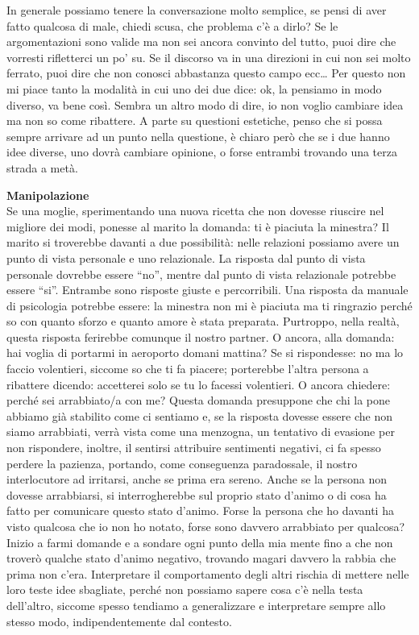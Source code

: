 \documentclass[12pt]{book} %
\begin{document}
In generale possiamo tenere la conversazione molto semplice, se pensi di aver fatto qualcosa di male, chiedi scusa, che problema c'è a dirlo? Se le argomentazioni sono valide ma non sei ancora convinto del tutto, puoi dire che vorresti rifletterci un po' su. Se il discorso va in una direzioni in cui non sei molto ferrato, puoi dire che non conosci abbastanza questo campo ecc…
Per questo non mi piace tanto la modalità in cui uno dei due dice: ok, la pensiamo in modo diverso, va bene così. Sembra un altro modo di dire, io non voglio cambiare idea ma non so come ribattere. A parte su questioni estetiche, penso che si possa sempre arrivare ad un punto nella questione, è chiaro però che se i due hanno idee diverse, uno dovrà cambiare opinione, o forse entrambi trovando una terza strada a metà.

\noindent \textbf{\large Manipolazione} \\
Se una moglie, sperimentando una nuova ricetta che non dovesse riuscire nel migliore dei modi,
ponesse al marito la domanda: ti è piaciuta la minestra? Il marito si troverebbe davanti a due possibilità: nelle
relazioni possiamo avere un punto di vista personale e uno relazionale. La risposta dal punto di vista personale
dovrebbe essere “no”, mentre dal punto di vista relazionale potrebbe essere “si”. Entrambe sono risposte giuste e
percorribili. Una risposta da manuale di psicologia potrebbe essere: la minestra non mi è piaciuta ma ti ringrazio
perché so con quanto sforzo e quanto amore è stata preparata. Purtroppo, nella realtà, questa risposta ferirebbe
comunque il nostro partner. O ancora, alla domanda: hai voglia di portarmi in aeroporto domani mattina? Se si
rispondesse: no ma lo faccio volentieri, siccome so che ti fa piacere; porterebbe l'altra persona a ribattere dicendo:
accetterei solo se tu lo facessi volentieri. O ancora chiedere: perché sei arrabbiato/a con me? Questa domanda
presuppone che chi la pone abbiamo già stabilito come ci sentiamo e, se la risposta dovesse essere che non siamo
arrabbiati, verrà vista come una menzogna, un tentativo di evasione per non rispondere, inoltre, il sentirsi attribuire
sentimenti negativi, ci fa spesso perdere la pazienza, portando, come conseguenza paradossale, il nostro
interlocutore ad irritarsi, anche se prima era sereno. Anche se la persona non dovesse arrabbiarsi, si interrogherebbe
sul proprio stato d'animo o di cosa ha fatto per comunicare questo stato d'animo. 
Forse la persona che ho davanti ha visto qualcosa che io non ho notato,
forse sono davvero arrabbiato per qualcosa? Inizio a farmi domande e a sondare ogni punto della mia mente fino a che
non troverò qualche stato d'animo negativo, trovando magari davvero la rabbia che prima non
c'era. Interpretare il comportamento degli altri rischia di mettere nelle loro teste idee
sbagliate, perché non possiamo sapere cosa c'è nella testa dell'altro, siccome spesso tendiamo a generalizzare e
interpretare sempre allo stesso modo, indipendentemente dal contesto. 
\end{document}
